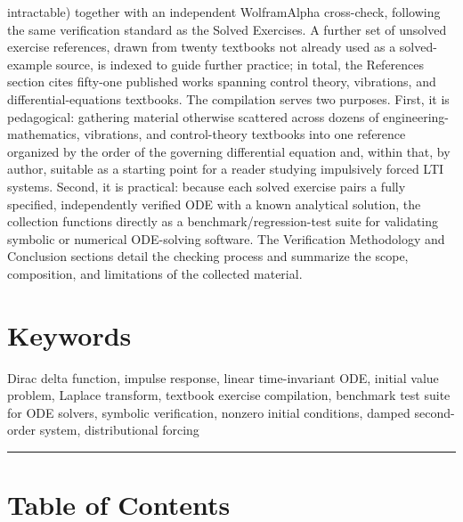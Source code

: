 \documentclass[
  11pt,
]{article}
\begin{document}
intractable) together with an independent WolframAlpha cross-check,
following the same verification standard as the Solved Exercises. A
further set of unsolved exercise references, drawn from twenty textbooks
not already used as a solved-example source, is indexed to guide further
practice; in total, the References section cites fifty-one published
works spanning control theory, vibrations, and differential-equations
textbooks. The compilation serves two purposes. First, it is
pedagogical: gathering material otherwise scattered across dozens of
engineering-mathematics, vibrations, and control-theory textbooks into
one reference organized by the order of the governing differential
equation and, within that, by author, suitable as a starting point for a
reader studying impulsively forced LTI systems. Second, it is practical:
because each solved exercise pairs a fully specified, independently
verified ODE with a known analytical solution, the collection functions
directly as a benchmark/regression-test suite for validating symbolic or
numerical ODE-solving software. The Verification Methodology and
Conclusion sections detail the checking process and summarize the scope,
composition, and limitations of the collected material.

\hypertarget{keywords}{%
\section{Keywords}\label{keywords}}

Dirac delta function, impulse response, linear time-invariant ODE,
initial value problem, Laplace transform, textbook exercise compilation,
benchmark test suite for ODE solvers, symbolic verification, nonzero
initial conditions, damped second-order system, distributional forcing

\begin{center}\rule{0.5\linewidth}{0.5pt}\end{center}

\hypertarget{table-of-contents}{%
\section{Table of Contents}\label{table-of-contents}}
\end{document}
